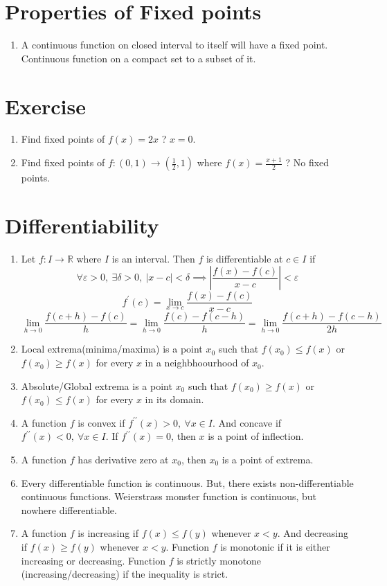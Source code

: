 \section{Properties of Fixed points}
\begin{enumerate}
	\item A continuous function on closed interval to itself will have a fixed point.
		\subitem Continuous function on a compact set to a subset of it.
\end{enumerate}

\section*{Exercise}
\begin{enumerate}
	\item Find fixed points of $f(x) =2x$ ? $x = 0$.
	\item Find fixed points of $f : (0,1) \to (\frac{1}{2}, 1)$ where $f(x) = \frac{x+1}{2}$ ? No fixed points.
\end{enumerate}

\section{Differentiability}
\begin{enumerate}
	\item Let $f : I \to \mathbb{R}$ where $I$ is an interval. Then $f$ is differentiable at $c \in I$ if
		$$ \forall \varepsilon > 0,\ \exists \delta > 0,\ |x-c| < \delta \implies \left| \frac{f(x)-f(c)}{x-c} \right| < \varepsilon $$
		$$ f^\prime(c) = \lim_{x \to c} \frac{f(x)-f(c)}{x-c} $$
		$$ \lim_{h \to 0} \frac{f(c+h)-f(c)}{h} = \lim_{h \to 0} \frac{f(c)-f(c-h)}{h} = \lim_{h \to 0} \frac{f(c+h)-f(c-h)}{2h} $$
	\item Local extrema(minima/maxima) is a point $x_0$ such that $f(x_0) \le f(x)$ or $f(x_0) \ge f(x)$ for every $x$ in a neighbhoourhood of $x_0$.
	\item Absolute/Global extrema is a point $x_0$ such that $f(x_0) \ge f(x)$ or $f(x_0) \le f(x)$ for every $x$ in its domain.
	\item A function $f$ is convex if $f^{\prime\prime}(x) > 0,\ \forall x \in I$. And concave if $f^{\prime\prime}(x) < 0,\ \forall x \in I$. If $f^{\prime\prime}(x) = 0$, then $x$ is a point of inflection.
	\item A function $f$ has derivative zero at $x_0$, then $x_0$ is a point of extrema.
	\item Every differentiable function is continuous. But, there exists non-differentiable continuous functions. 
		\subitem Weierstrass monster function is continuous, but nowhere differentiable.
	\item A function $f$ is increasing if $f(x)\le f(y)$ whenever $x<y$. And decreasing if $f(x) \ge f(y)$ whenever $x<y$. Function $f$ is monotonic if it is either increasing or decreasing. Function $f$ is strictly monotone (increasing/decreasing) if the inequality is strict.
\end{enumerate}

